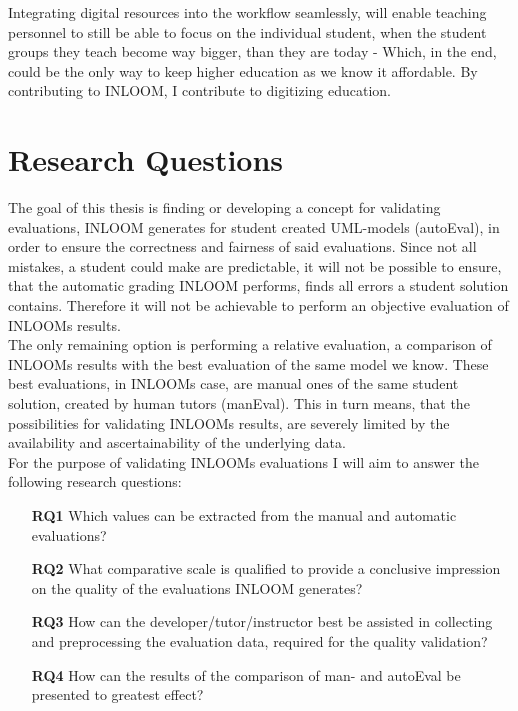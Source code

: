 Integrating digital resources into the workflow seamlessly, will enable teaching 
personnel to still be able to focus on the individual student, when the student
groups they teach become way bigger, than they are today - Which, in the end, could be
the only way to keep higher education as we know it affordable. By contributing to 
INLOOM, I contribute to digitizing education.

\section[Research Questions]{Research Questions}

The goal of this thesis is finding or developing a concept for validating evaluations,
INLOOM generates for student created UML-models (autoEval), in order to ensure the correctness
and fairness of said evaluations. Since not all mistakes, a student could make are predictable,
it will not be possible to ensure, that the automatic grading INLOOM performs, finds all
errors a student solution contains. Therefore it will not be achievable to perform an 
objective evaluation of INLOOMs results. 
\\

The only remaining option is performing a relative evaluation, a comparison of INLOOMs 
results with the best evaluation of the same model we know. These best evaluations, 
in INLOOMs case, are manual ones of the same student solution, created by human tutors 
(manEval). This in turn means, that the possibilities for validating INLOOMs results, 
are severely limited by the availability and ascertainability of the underlying data.
\\

For the purpose of validating INLOOMs evaluations I will aim to answer the following
research questions:

\begin{itemize}
    \item[\textbf{RQ1}] Which values can be extracted from the manual and automatic evaluations?
    \item[\textbf{RQ2}] What comparative scale is qualified to provide a conclusive impression
    on the quality of the evaluations INLOOM generates? 
    \item[\textbf{RQ3}] How can the developer/tutor/instructor best be assisted in collecting
    and preprocessing the evaluation data, required for the quality validation? 
    \item[\textbf{RQ4}] How can the results of the comparison of man- and autoEval be presented
    to greatest effect? 
\end{itemize}

